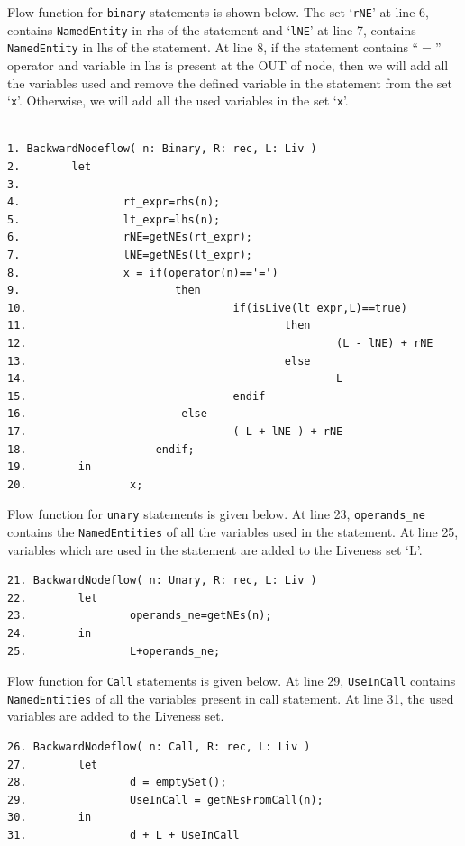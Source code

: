 \documentclass[11pt,a4paper,openright]{report}
\begin{document}
Flow function for \texttt{binary} statements is shown below. The set `\texttt{rNE}' at line 6, contains \texttt{NamedEntity} in rhs of the statement and `\texttt{lNE}' at line 7, contains
\texttt{NamedEntity} in lhs of the statement. At line 8, if the statement contains ``$=$'' operator and variable in lhs is present at the OUT of node, then we will add
all the variables used and remove the defined variable in the statement from the set `\texttt{x}'. Otherwise, we will add all the used variables in the set
`\texttt{x}'.

\begin{lstlisting}

1. BackwardNodeflow( n: Binary, R: rec, L: Liv )
2.        let
3.                
4.                rt_expr=rhs(n);
5.                lt_expr=lhs(n);
6.                rNE=getNEs(rt_expr);
7.                lNE=getNEs(lt_expr);
8.                x = if(operator(n)=='=')
9.                        then
10.                                if(isLive(lt_expr,L)==true)
11.                                        then
12.                                                (L - lNE) + rNE
13.                                        else
14.                                                L
15.                                endif
16.                        else
17.                                ( L + lNE ) + rNE
18.	                   endif;
19.        in
20.                x;

\end{lstlisting}


Flow function for \texttt{unary} statements is given below. At line 23, \texttt{operands\_ne} contains the \texttt{NamedEntities} of all the variables used in the 
statement. At line 25, variables which are used in the statement are added to the Liveness set `L'.

\begin{lstlisting}
21. BackwardNodeflow( n: Unary, R: rec, L: Liv )
22.        let
23.                operands_ne=getNEs(n);
24.        in
25.                L+operands_ne;

\end{lstlisting}

Flow function for \texttt{Call} statements is given below. At line 29, \texttt{UseInCall} contains \texttt{NamedEntities} of all the variables present in call
statement. At line 31, the used variables are added to the Liveness set.

\begin{lstlisting}
26. BackwardNodeflow( n: Call, R: rec, L: Liv )
27.        let
28.                d = emptySet();
29.                UseInCall = getNEsFromCall(n);
30.        in
31.                d + L + UseInCall
\end{lstlisting}
\end{document}
